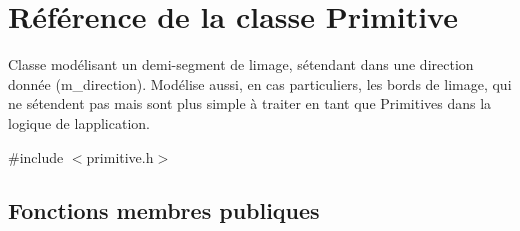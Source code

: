 \hypertarget{classPrimitive}{}\section{Référence de la classe Primitive}
\label{classPrimitive}


Classe modélisant un demi-\/segment de l\textquotesingle{}image, s\textquotesingle{}étendant dans une direction donnée (m\+\_\+direction). Modélise aussi, en cas particuliers, les bords de l\textquotesingle{}image, qui ne s\textquotesingle{}étendent pas mais sont plus simple à traiter en tant que Primitives dans la logique de l\textquotesingle{}application.  




{\ttfamily \#include $<$primitive.\+h$>$}

\subsection*{Fonctions membres publiques}
